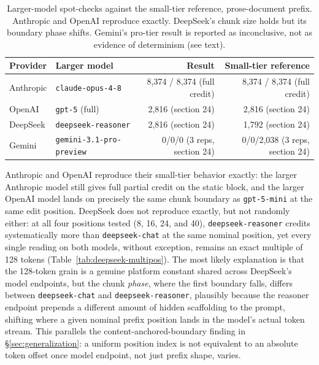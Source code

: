 \documentclass[11pt]{article}
\newcommand{\code}[1]{\texttt{#1}}
\begin{document}
\begin{table}[t]
\centering
\caption{Larger-model spot-checks against the small-tier reference, prose-document
prefix. Anthropic and OpenAI reproduce exactly. DeepSeek's chunk size holds
but its boundary phase shifts. Gemini's pro-tier result is reported as
inconclusive, not as evidence of determinism (see text).}
\label{tab:bigmodel}
\small
\begin{tabular}{@{}llrr@{}}
\toprule
Provider & Larger model & Result & Small-tier reference \\
\midrule
Anthropic & \code{claude-opus-4-8}    & 8{,}374 / 8{,}374 (full credit) & 8{,}374 / 8{,}374 (full credit) \\
OpenAI    & \code{gpt-5} (full)       & 2{,}816 (section 24)           & 2{,}816 (section 24) \\
DeepSeek  & \code{deepseek-reasoner}  & 2{,}816 (section 24)           & 1{,}792 (section 24) \\
Gemini    & \code{gemini-3.1-pro-preview} & 0/0/0 (3 reps, section 24) & 0/0/2{,}038 (3 reps, section 24) \\
\bottomrule
\end{tabular}
\end{table}

Anthropic and OpenAI reproduce their small-tier behavior exactly: the
larger Anthropic model still gives full partial credit on the static
block, and the larger OpenAI model lands on precisely the same chunk
boundary as \code{gpt-5-mini} at the same edit position. DeepSeek does not
reproduce exactly, but not randomly either: at all four positions tested
(8, 16, 24, and 40), \code{deepseek-reasoner} credits systematically more
than \code{deepseek-chat} at the same nominal position, yet every single
reading on both models, without exception, remains an exact multiple of
128 tokens (Table~\ref{tab:deepseek-multipos}). The most likely
explanation is that the 128-token grain is a genuine platform constant
shared across DeepSeek's model endpoints, but the chunk \emph{phase}, where
the first boundary falls, differs between \code{deepseek-chat} and
\code{deepseek-reasoner}, plausibly because the reasoner endpoint prepends
a different amount of hidden scaffolding to the prompt, shifting where a
given nominal prefix position lands in the model's actual token stream.
This parallels the content-anchored-boundary finding in
\S\ref{sec:generalization}: a uniform position index is not equivalent to
an absolute token offset once model endpoint, not just prefix shape,
varies.
\end{document}

